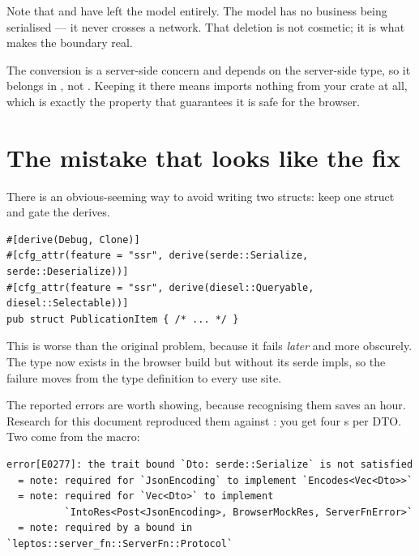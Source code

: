 Note that  and  have left the model entirely. The model has no
business being serialised --- it never crosses a network. That deletion is not cosmetic; it is what
makes the boundary real.

\begin{pattern}
The conversion is a server-side concern and depends on the server-side type, so it belongs in
, not . Keeping it there means  imports nothing from your
crate at all, which is exactly the property that guarantees it is safe for the browser.
\end{pattern}

\section{The mistake that looks like the fix}

There is an obvious-seeming way to avoid writing two structs: keep one struct and gate the derives.

\begin{antipattern}
\begin{lstlisting}[style=rs]
#[derive(Debug, Clone)]
#[cfg_attr(feature = "ssr", derive(serde::Serialize, serde::Deserialize))]
#[cfg_attr(feature = "ssr", derive(diesel::Queryable, diesel::Selectable))]
pub struct PublicationItem { /* ... */ }
\end{lstlisting}
This is worse than the original problem, because it fails \emph{later} and more obscurely. The
type now exists in the browser build but without its serde impls, so the failure moves from the
type definition to every use site.
\end{antipattern}

The reported errors are worth showing, because recognising them saves an hour. Research for this
document reproduced them against : you get four s per DTO.
Two come from the \code{\#[server]} macro:

\begin{lstlisting}[style=out]
error[E0277]: the trait bound `Dto: serde::Serialize` is not satisfied
  = note: required for `JsonEncoding` to implement `Encodes<Vec<Dto>>`
  = note: required for `Vec<Dto>` to implement
          `IntoRes<Post<JsonEncoding>, BrowserMockRes, ServerFnError>`
  = note: required by a bound in `leptos::server_fn::ServerFn::Protocol`
\end{lstlisting}

